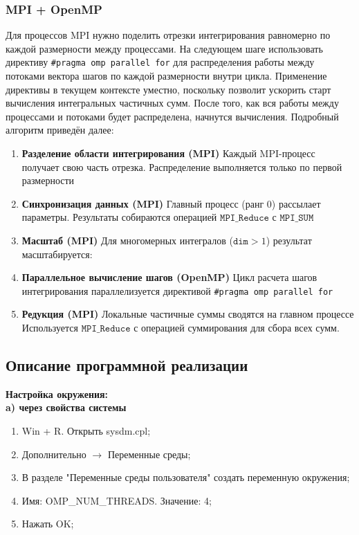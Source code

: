 \documentclass[14pt,a4paper]{article}
\begin{document}
\subsubsection{MPI + OpenMP}
Для процессов MPI нужно поделить отрезки интегрирования равномерно по каждой размерности между процессами. На следующем шаге использовать директиву \texttt{\#pragma omp parallel for} для распределения работы между потоками вектора шагов по каждой размерности внутри цикла. Применение директивы в текущем контексте уместно, поскольку позволит ускорить старт вычисления интегральных частичных сумм. После того, как вся работы между процессами и потоками будет распределена, начнутся вычисления. Подробный алгоритм приведён далее:

\begin{enumerate}
\item \textbf{Разделение области интегрирования (MPI)}
Каждый MPI-процесс получает свою часть отрезка.
Распределение выполняется только по первой размерности

\item \textbf{Синхронизация данных (MPI)}
Главный процесс (ранг 0) рассылает параметры.
Результаты собираются операцией $\mathtt{MPI\_Reduce}$ с $\mathtt{MPI\_SUM}$

\item \textbf{Масштаб (MPI)}
Для многомерных интегралов ($\mathtt{dim} > 1$) результат масштабируется:

\item \textbf{Параллельное вычисление шагов (OpenMP)}
Цикл расчета шагов интегрирования параллелизуется
директивой \texttt{\#pragma omp parallel for}

\item \textbf{Редукция (MPI)}
Локальные частичные суммы сводятся на главном процессе
Используется $\mathtt{MPI\_Reduce}$ с операцией суммирования
для сбора всех сумм.
\end{enumerate}

\subsection{Описание программной реализации}

\textbf{Настройка окружения:} 
\\
\textbf{a) через свойства системы}
\begin{enumerate}
\item Win + R. Открыть sysdm.cpl;
\item Дополнительно $\rightarrow$ Переменные среды;
\item В разделе "Переменные среды пользователя" создать переменную окружения;
\item Имя: OMP\_NUM\_THREADS. Значение: 4;
\item Нажать OK;
\end{enumerate}
\end{document}
